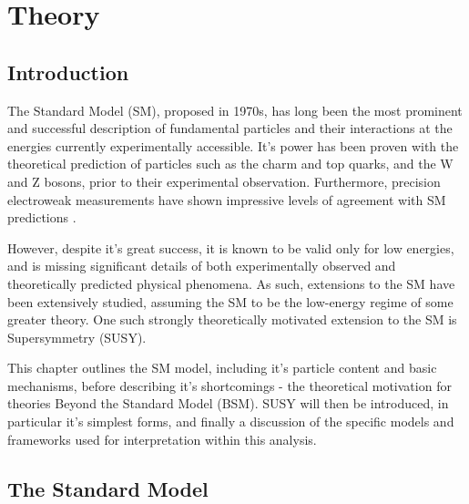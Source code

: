 
\chapter{Theory}
\label{ch:2}

\ifpdf
    \graphicspath{{Chapter2/Figs/Raster/}{Chapter2/Figs/PDF/}{Chapter2/Figs/}}
\else
    \graphicspath{{Chapter2/Figs/Vector/}{Chapter2/Figs/}}
\fi


\section{Introduction}  %
\label{sec:theory_intro}

The Standard Model (SM), proposed in 1970s, has long been the most prominent and 
successful description of fundamental particles and their interactions at the
energies currently experimentally accessible. It's power has been proven with the 
theoretical prediction of particles such as the charm and top quarks, and the W
and
Z bosons, prior to their experimental observation. Furthermore, precision 
electroweak measurements have shown impressive levels of 
agreement with SM predictions \cite{ALEPH:2010aa}.

However, despite it's great success, it is known to be valid only for low 
energies, and is missing significant details of both experimentally 
observed and theoretically predicted physical phenomena. As such, extensions to
the SM have been extensively studied, assuming the SM to be the low-energy 
regime of some greater theory. One such strongly theoretically motivated
extension to the SM is Supersymmetry (SUSY).

This chapter outlines the SM model, including it's particle content and basic 
mechanisms, before describing it's shortcomings - the theoretical 
motivation for theories Beyond the Standard Model (BSM). SUSY will then be 
introduced, in particular it's simplest forms, and finally a discussion of
the specific models and frameworks used for interpretation within this analysis.

\section{The Standard Model}
\label{sec:theory_current}


